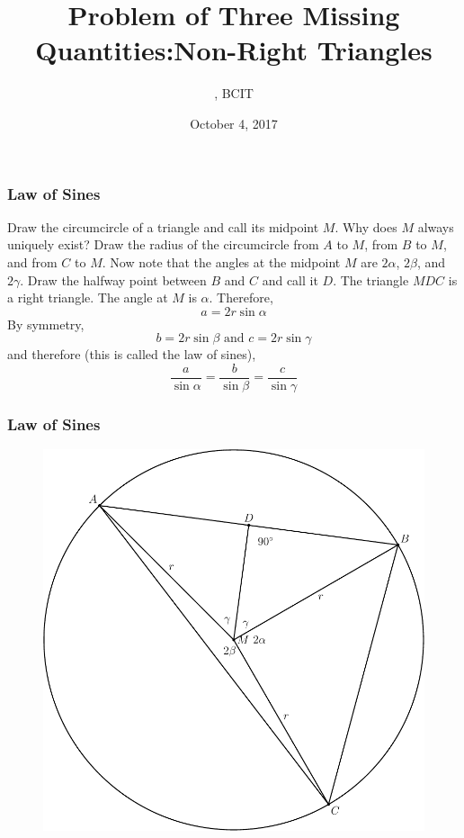 \documentclass[xcolor=dvipsnames]{beamer}
\title{Problem of Three Missing Quantities:\newline Non-Right Triangles}
\subtitle{{\CourseNumber}, BCIT}
\author{\CourseName}
\date{October 4, 2017}
\begin{document}
\begin{frame}
  \titlepage
\end{frame}

\begin{frame}
  \frametitle{Law of Sines}
Draw the circumcircle of a triangle and call its midpoint $M$. Why
does $M$ always uniquely exist? Draw the radius of the circumcircle
from $A$ to $M$, from $B$ to $M$, and from $C$ to $M$. Now note that
the angles at the midpoint $M$ are $2\alpha$, $2\beta$, and $2\gamma$.
Draw the halfway point between $B$ and $C$ and call it $D$. The
triangle $MDC$ is a right triangle. The angle at $M$ is $\alpha$.
Therefore,
\begin{equation}
  \label{eq:ideasaer}
  a=2r\sin\alpha
\end{equation}
By symmetry,
\begin{equation}
  \label{eq:aitheroo}
  b=2r\sin\beta\mbox{ and }c=2r\sin\gamma
\end{equation}
and therefore (this is called the \alert{law of sines}),
\begin{equation}
  \label{eq:phahzahc}
  \frac{a}{\sin\alpha}=\frac{b}{\sin\beta}=\frac{c}{\sin\gamma}
\end{equation}
\end{frame}

\begin{frame}
  \frametitle{Law of Sines}
    \begin{figure}[h]
    \includegraphics[scale=.5]{./sinelaw.pdf}
  \end{figure}
\end{frame}
\end{document}
